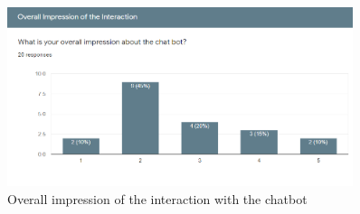 \begin{figure}[!h]
    \centering
    \includegraphics[width=0.9\textwidth]{img/Overall_Impression.PNG}
    \caption{Overall impression of the interaction with the chatbot}
    \label{fig:overallImpre}
\end{figure}

